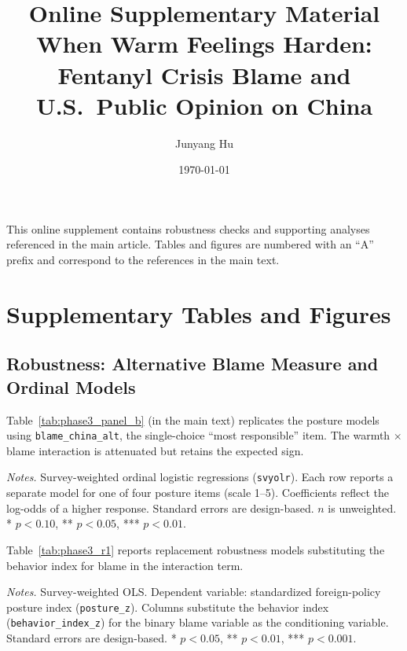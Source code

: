 \documentclass[12pt,letterpaper]{article}
\title{Online Supplementary Material\\
\large When Warm Feelings Harden: Fentanyl Crisis Blame and U.S.\ Public Opinion on China}
\author{Junyang Hu}
\date{\today}
\begin{document}
\maketitle
\thispagestyle{empty}

\noindent This online supplement contains robustness checks and supporting analyses referenced in the main article. Tables and figures are numbered with an ``A'' prefix and correspond to the references in the main text.

\newpage
\setcounter{page}{1}

\appendix
\renewcommand{\thetable}{A\arabic{table}}
\setcounter{table}{0}
\renewcommand{\thefigure}{A\arabic{figure}}
\setcounter{figure}{0}

\section{Supplementary Tables and Figures}
\label{sec:appendix}

\subsection{Robustness: Alternative Blame Measure and Ordinal Models}

Table~\ref{tab:phase3_panel_b} (in the main text) replicates the posture models using \texttt{blame\_china\_alt}, the single-choice ``most responsible'' item. The warmth $\times$ blame interaction is attenuated but retains the expected sign.

\begin{table}[htbp]
\centering
\small
\caption{Robustness: Ordinal Logit on Individual Posture Items}
\label{tab:app_olr}

\par\vspace{0.5ex}
{\footnotesize\textit{Notes.} Survey-weighted ordinal logistic regressions (\texttt{svyolr}). Each row reports a separate model for one of four posture items (scale 1--5). Coefficients reflect the log-odds of a higher response. Standard errors are design-based. $n$ is unweighted. * $p<0.10$, ** $p<0.05$, *** $p<0.01$.}
\end{table}

Table~\ref{tab:phase3_r1} reports replacement robustness models substituting the behavior index for blame in the interaction term.

\begin{table}[htbp]
\centering
\small
\caption{Robustness: Behavior Index in Place of Blame}
\label{tab:phase3_r1}

\par\vspace{0.5ex}
{\footnotesize\textit{Notes.} Survey-weighted OLS. Dependent variable: standardized foreign-policy posture index (\texttt{posture\_z}). Columns substitute the behavior index (\texttt{behavior\_index\_z}) for the binary blame variable as the conditioning variable. Standard errors are design-based. * $p<0.05$, ** $p<0.01$, *** $p<0.001$.}
\end{table}
\end{document}

